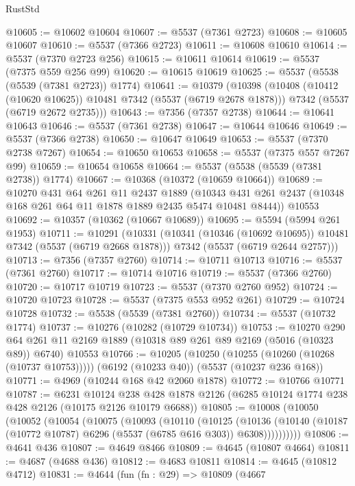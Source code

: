 \begin{lexlean}{RustStd}
\begin{coremodule}
@10605 := @10602 @10604
@10607 := @5537 (@7361 @2723)
@10608 := @10605 @10607
@10610 := @5537 (@7366 @2723)
@10611 := @10608 @10610
@10614 := @5537 (@7370 @2723 @256)
@10615 := @10611 @10614
@10619 := @5537 (@7375 @559 @256 @99)
@10620 := @10615 @10619
@10625 := @5537 (@5538 (@5539 (@7381 @2723)) @1774)
@10641 := @10379
    (@10398
      (@10408 (@10412 (@10620 @10625)) @10481 @7342 (@5537 (@6719 @2678 @1878)))
      @7342
      (@5537 (@6719 @2672 @2735)))
@10643 := @7356 (@7357 @2738)
@10644 := @10641 @10643
@10646 := @5537 (@7361 @2738)
@10647 := @10644 @10646
@10649 := @5537 (@7366 @2738)
@10650 := @10647 @10649
@10653 := @5537 (@7370 @2738 @7267)
@10654 := @10650 @10653
@10658 := @5537 (@7375 @557 @7267 @99)
@10659 := @10654 @10658
@10664 := @5537 (@5538 (@5539 (@7381 @2738)) @1774)
@10667 := @10368 (@10372 (@10659 @10664))
@10689 := @10270
    @431
    @64
    @261
    @11
    @2437
    @1889
    (@10343 @431 @261 @2437 (@10348 @168 @261 @64 @11 @1878 @1889 @2435 @5474 @10481 @8444))
    @10553
@10692 := @10357 (@10362 (@10667 @10689))
@10695 := @5594 (@5994 @261 @1953)
@10711 := @10291
    (@10331
      (@10341 (@10346 (@10692 @10695)) @10481 @7342 (@5537 (@6719 @2668 @1878)))
      @7342
      (@5537 (@6719 @2644 @2757)))
@10713 := @7356 (@7357 @2760)
@10714 := @10711 @10713
@10716 := @5537 (@7361 @2760)
@10717 := @10714 @10716
@10719 := @5537 (@7366 @2760)
@10720 := @10717 @10719
@10723 := @5537 (@7370 @2760 @952)
@10724 := @10720 @10723
@10728 := @5537 (@7375 @553 @952 @261)
@10729 := @10724 @10728
@10732 := @5538 (@5539 (@7381 @2760))
@10734 := @5537 (@10732 @1774)
@10737 := @10276 (@10282 (@10729 @10734))
@10753 := @10270
    @290
    @64
    @261
    @11
    @2169
    @1889
    (@10318 @89 @261 @89 @2169 (@5016 (@10323 @89)) @6740)
    @10553
@10766 := @10205
    (@10250 (@10255 (@10260 (@10268 (@10737 @10753)))))
    (@6192 (@10233 @40))
    (@5537 (@10237 @236 @168))
@10771 := @4969 (@10244 @168 @42 @2060 @1878)
@10772 := @10766 @10771
@10787 := @6231
    @10124
    @238
    @428
    @1878
    @2126
    (@6285 @10124 @1774 @238 @428 @2126 (@10175 @2126 @10179 @6688))
@10805 := @10008
    (@10050
      (@10052
        (@10054
          (@10075
            (@10093
              (@10110
                (@10125
                  (@10136
                    (@10140 (@10187 (@10772 @10787) @6296 (@5537 (@6785 @616 @303)) @6308))))))))))
@10806 := @4641 @436
@10807 := @4649 @8466
@10809 := @4645 (@10807 @4664)
@10811 := @4687 (@4688 @436)
@10812 := @4683 @10811
@10814 := @4645 (@10812 @4712)
@10831 := @4644
    (fun (fn : @29) =>
    @10809
      (@4667

\end{coremodule}
\end{lexlean}
